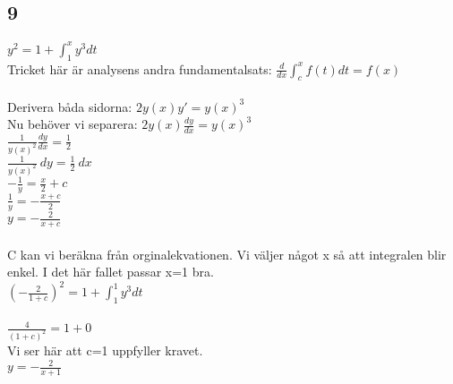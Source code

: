 \documentclass{article}
\begin{document}
\subsection*{9}
$y^2 = 1 + \int_{1}^{x} {y^3 dt}$ \\
Tricket här är analysens andra fundamentalsats: 
$\frac{d}{dx} \int_{c}^{x} {f(t) dt} = f(x)$ \\\\
Derivera båda sidorna:
$2y(x) y' = y(x)^3$ \\
Nu behöver vi separera: $2y(x) \frac{dy}{dx} = y(x)^3$ \\ 
$\frac{1}{y(x)^{2}} \frac{dy}{dx} = \frac{1}{2}$ \\ 
$\frac{1}{y(x)^{2}} \> dy = \frac{1}{2} \> dx$ \\ 
$-\frac{1}{y} = \frac{x}{2} + c$ \\
$\frac{1}{y} = -\frac{x+c}{2} $ \\
$y = -\frac{2}{x+c} $ \\\\
C kan vi beräkna från orginalekvationen. Vi väljer något x så att integralen blir enkel. I det här fallet passar x=1 bra. \\ 
$(-\frac{2}{1+c})^2 = 1 + \int_{1}^{1} {y^3 dt}$ \\\\
$\frac{4}{(1+c)^2} = 1 + 0$ \\
Vi ser här att c=1 uppfyller kravet. \\
$y = -\frac{2}{x+1} $ \\
\end{document}
